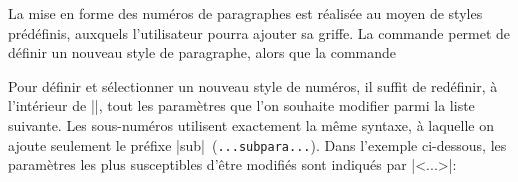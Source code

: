 La mise en forme des numéros de paragraphes est réalisée au moyen de styles prédéfinis, auxquels l'utilisateur pourra ajouter sa griffe. La commande  permet de définir un nouveau style de paragraphe, alors que la commande 

\begin{noprint}
\newcommand{\makeparastyle}[2]{\expandafter\gdef\csname @parastyle@#1\endcsname{#2}}
\newcommand{\parastyle}[1]{\csname @parastyle@#1\endcsname}
\end{noprint}

Pour définir et sélectionner un nouveau style de numéros, il suffit de redéfinir, à l'intérieur de |\makeparastyle|, tout les paramètres que l'on souhaite modifier parmi la liste suivante. Les sous-numéros utilisent exactement la même syntaxe, à laquelle on ajoute seulement le préfixe |sub|~(\texttt{...subpara...}). Dans l'exemple ci-dessous, les paramètres les plus susceptibles d'être modifiés sont indiqués par |<...>|:

\begin{macro}
\end{macro}

\begin{noprint}
\newcommand{\paraskip}{}
\newcommand{\parasep}{}
\newcommand{\paranumsep}{}
\newcommand{\paracolour}{}
\newcommand{\paranumcolour}{}
\newcommand{\paratitlestyle}[1]{#1}
\newcommand{\paranumstyle}[1]{#1}

\newcommand{\subparaskip}{}
\newcommand{\subparasep}{}
\newcommand{\subparanumsep}{}
\newcommand{\subparanumdash}{}
\newcommand{\subparacolour}{}
\newcommand{\subparanumcolour}{}
\newcommand{\subparatitlestyle}[1]{#1}
\newcommand{\subparanumstyle}[1]{#1}
\end{noprint}

